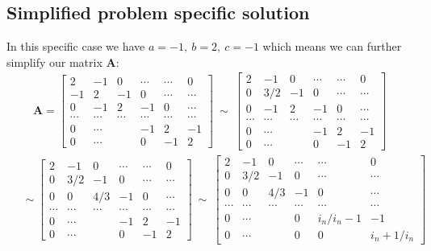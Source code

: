 \documentclass[american,a4paper,12pt]{article}
\renewcommand{\vec}[1]{\mathbf{#1}} %
\begin{document}
\subsection{Simplified problem specific solution}
In this specific case we have $a = -1,\ b = 2,\ c = -1$ which means we can further simplify our matrix $\vec{A}$:
\begin{align*}
    \vec{A} =
    \begin{bmatrix}
    2 & -1 & 0 & \cdots & \cdots & 0 \\
    -1 & 2 & -1 & 0 & \cdots & \cdots \\
    0 & -1 & 2 & -1 & 0 & \cdots \\
    \cdots & \cdots & \cdots & \cdots & \cdots & \cdots \\
    0 & \cdots & & -1 & 2 & -1 \\
    0 & \cdots & & 0 & -1 & 2
    \end{bmatrix}
    \ \sim \
    \begin{bmatrix}
    2 & -1 & 0 & \cdots & \cdots & 0 \\
    0 & 3/2 & -1 & 0 & \cdots & \cdots \\
    0 & -1 & 2 & -1 & 0 & \cdots \\
    \cdots & \cdots & \cdots & \cdots & \cdots & \cdots \\
    0 & \cdots & & -1 & 2 & -1 \\
    0 & \cdots & & 0 & -1 & 2
    \end{bmatrix}
\end{align*}
\begin{align*}
    \quad \sim
    \begin{bmatrix}
    2 & -1 & 0 & \cdots & \cdots & 0 \\
    0 & 3/2 & -1 & 0 & \cdots & \cdots \\
    0 & 0 & 4/3 & -1 & 0 & \cdots \\
    \cdots & \cdots & \cdots & \cdots & \cdots & \cdots \\
    0 & \cdots & & -1 & 2 & -1 \\
    0 & \cdots & & 0 & -1 & 2
    \end{bmatrix}
    \ \sim \
    \begin{bmatrix}
    2 & -1 & 0 & \cdots & \cdots & 0 \\
    0 & 3/2 & -1 & 0 & \cdots & \cdots \\
    0 & 0 & 4/3 & -1 & 0 & \cdots \\
    \cdots & \cdots & \cdots & \cdots & \cdots & \cdots \\
    0 & \cdots & & 0 & i_n/{i_n-1} & -1 \\
    0 & \cdots & & 0 & 0 & {i_n+1}/i_n
    \end{bmatrix} \\
\end{align*}
\end{document}
